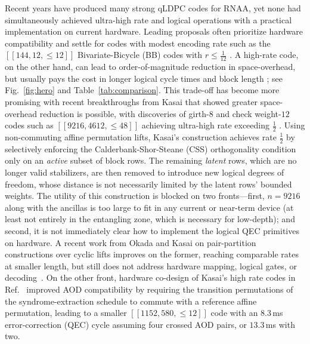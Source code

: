 \documentclass[amsmath,amssymb,twocolumn,aps,prl,superscriptaddress,nofootinbib]{revtex4-2}
\theoremstyle{definition}
\begin{document}
Recent years have produced many strong qLDPC codes for RNAA, yet none had simultaneously achieved ultra-high rate and logical operations with a practical implementation on current hardware. Leading proposals often prioritize hardware compatibility and settle for codes with modest encoding rate such as the  $[[144,12,\leq 12]]$ Bivariate-Bicycle (BB) codes with $r\leq \frac {1}{12}$ \cite{Bravyi_2024}. A high-rate code, on the other hand, can lead to order-of-magnitude reduction in space-overhead, but usually pays the cost in longer logical cycle times and block length \cite{cain2026shorsalgorithmpossible10000}; see Fig.~\ref{fig:hero} and Table~\ref{tab:comparison}. This trade-off has become more promising with recent breakthroughs from Kasai that showed greater space-overhead reduction is possible, with discoveries of girth-$8$ and check weight-$12$ codes such as $[[9216,4612,\leq48]]$ achieving ultra-high rate exceeding $\frac12$ \cite{kasai2026breakingorthogonalitybarrierquantum}. Using non-commuting affine permutation lifts, Kasai's construction achieves rate $\frac 12$ by selectively enforcing the Calderbank-Shor-Steane (CSS) orthogonality condition only on an \emph{active} subset of block rows. The remaining \emph{latent} rows, which are no longer valid stabilizers, are then removed to introduce new logical degrees of freedom, whose distance is not necessarily limited by the latent rows' bounded weights. The utility of this construction is blocked on two fronts---first, $n =9216$ along with the ancillas is too large to fit in any current or near-term device (at least not entirely in the entangling zone, which is necessary for low-depth); and second, it is not immediately clear how to implement the logical QEC primitives on hardware. A recent work from Okada and Kasai on pair-partition constructions over cyclic lifts improves on the former, reaching comparable rates at smaller length, but still does not address hardware mapping, logical gates, or decoding~\cite{okada2026pairpartitionconstructionscpmbasedquantum}. On the other front, hardware co-design of Kasai's high rate codes in Ref.~\cite{zhao2026ultrahighratequantumerrorcorrection} improved AOD compatibility by requiring the transition permutations of the syndrome-extraction schedule to commute with a reference affine permutation, leading to a smaller $[[1152,580,\le12]]$ code with an $8.3\,$ms error-correction (QEC) cycle assuming four crossed AOD pairs, or $13.3\,$ms with two. 
\end{document}

